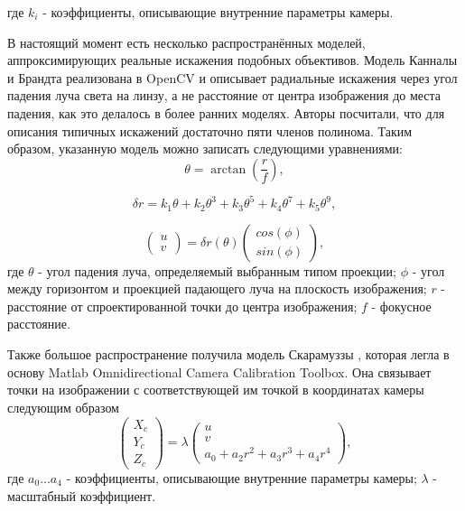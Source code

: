 где $k_i$ - коэффициенты, описывающие внутренние параметры камеры. 

В настоящий момент есть несколько распространённых моделей, аппроксимирующих реальные искажения подобных объективов. Модель Канналы и 
Брандта \cite{opencv_model} реализована в OpenCV и описывает радиальные искажения через угол падения луча света на линзу, а не расстояние  
от центра изображения до места падения, как это делалось в более ранних моделях. Авторы посчитали, что для описания типичных искажений достаточно 
пяти членов полинома. Таким образом, указанную модель можно записать следующими уравнениями:
\begin{equation}	
        \theta = \arctan(\frac{r}{f}),
        \label{eqn:kannala_theta}
\end{equation}

\begin{equation}	
    \delta r = k_1\theta + k_2\theta^3 + k_3\theta^5 + k_4\theta^7 + k_5\theta^9,
    \label{eqn:kannala_r}
\end{equation}

\begin{equation}	
    \begin{pmatrix}u\\v\end{pmatrix} = \delta r(\theta)\begin{pmatrix}cos(\phi)\\sin(\phi)\end{pmatrix},
    \label{eqn:kannala_uv}
\end{equation}
где $\theta$ - угол падения луча, определяемый выбранным типом проекции; $\phi$ - угол между горизонтом 
и проекцией падающего луча на плоскость изображения; $r$ - расстояние от спроектированной точки до центра
изображения; $f$ - фокусное расстояние.

Также большое распространение получила модель Скарамуззы \cite{scaramuzza}, которая легла в основу Matlab Omnidirectional 
Camera Calibration Toolbox. Она связывает точки на изображении с соответствующей им точкой в координатах камеры 
следующим образом
\begin{equation}	
    \begin{pmatrix}X_c\\Y_c\\Z_c\end{pmatrix} = \lambda \begin{pmatrix}u\\v\\a_0 + a_2 r^2 + a_3 r^3 + a_4 r^4\end{pmatrix},
    \label{eqn:scaramuzza}
\end{equation}
где $a_0 ... a_4$ - коэффициенты, описывающие внутренние параметры камеры; $\lambda$ - масштабный коэффициент.



